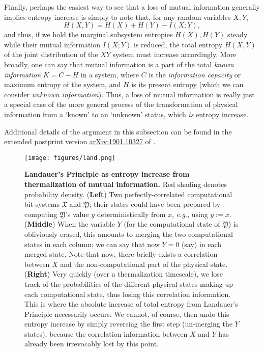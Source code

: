 \documentclass[preprints,article,accept,moreauthors,pdftex]{Definitions/mdpi}
\begin{document}
\begin{paracol}{2}
Finally, perhaps the easiest way to see that a loss of mutual information generally implies entropy increase is simply to note that, for any random variables $X,Y$,
\begin{equation}
    H(X,Y) = H(X) + H(Y) - I(X;Y),
\end{equation}
and thus, if we hold the marginal subsystem entropies $H(X),H(Y)$ steady while their mutual information $I(X;Y)$ is reduced, the total entropy $H(X,Y)$ of the joint distribution of the $XY$ system must increase accordingly. More broadly, one can say that mutual information is a part of the total \textit{known information} $K=C-H$ in a system, where $C$ is the \textit{information capacity} or maximum entropy of the system, and $H$ is its present entropy (which we can consider \textit{unknown information}). Thus, a loss of mutual information is really just a special case of the more general process of the transformation of physical information from a `known' to an `unknown' status, which \textit{is} entropy increase.

Additional details of the argument in this subsection can be found in the extended postprint version \href{https://arxiv.org/abs/1901.10327}{arXiv:1901.10327} of \cite{Fra18}.

\begin{figure}[t]
\texttt{[image: figures/land.png]}
\caption{\textbf{Landauer's Principle as entropy increase from thermalization of mutual information.} Red shading denotes probability density. (\textbf{Left}) Two perfectly-correlated computational bit-systems $\mathfrak{X}$ and $\mathfrak{Y}$; their states could have been prepared by computing $\mathfrak{Y}$'s value $y$ deterministically from $x$, \emph{e.g.}, using $y:=x$. (\textbf{Middle}) When the variable $Y$ (for the computational state of $\mathfrak{Y}$) is obliviously erased, this amounts to merging the two computational states in each column; we can say that now $Y=0$ (say) in each merged state. Note that now, there briefly exists a correlation between $X$ and the non-computational part of the physical state. (\textbf{Right}) Very quickly (over a thermalization timescale), we lose track of the probabilities of the different physical states making up each computational state, thus losing this correlation information. This is where the absolute increase of total entropy from Landauer’s Principle necessarily occurs. We cannot, of course, then undo this entropy increase by simply reversing the first step (un-merging the $Y$ states), because the correlation information between $X$ and $Y$ has already been irrevocably lost by this point.\label{fig:land}}
\end{figure}   


\end{paracol}
\end{document}
